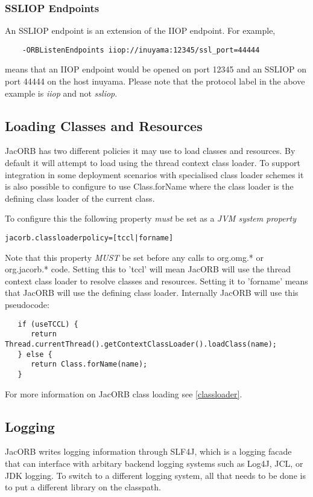 \subsubsection{SSLIOP Endpoints}
An SSLIOP endpoint is an extension of the IIOP endpoint. For example,
\begin{verbatim}
    -ORBListenEndpoints iiop://inuyama:12345/ssl_port=44444
\end{verbatim}
means that an IIOP endpoint would be opened on port 12345 and an SSLIOP on
port 44444 on the host inuyama.  Please note that the protocol label in the
above example is \emph{iiop} and not \emph{ssliop}.

\subsection{Loading Classes and Resources}
\label{tccl}
JacORB has two different policies it may use to load classes and resources. By default it will attempt to load
using the thread context class loader. To support integration in some deployment scenarios with specialised class
loader schemes it is also possible to configure to use Class.forName where the class loader is the defining class
loader of the current class.

To configure this the following property \emph{must} be set as a \emph{JVM system property}
\begin{verbatim}
jacorb.classloaderpolicy=[tccl|forname]
\end{verbatim}
Note that this property \emph{MUST} be set before any calls to org.omg.* or org.jacorb.* code. Setting this
to 'tccl' will mean JacORB will use the thread context class loader to resolve classes and resources. Setting it to
'forname' means that JacORB will use the defining class loader. Internally JacORB will use this pseudocode:

\begin{verbatim}
   if (useTCCL) {
      return Thread.currentThread().getContextClassLoader().loadClass(name);
   } else {
      return Class.forName(name);
   }
\end{verbatim}

For more information on JacORB class loading see \ref{classloader}.

\subsection{Logging}

JacORB writes logging information through SLF4J, which is a logging
facade that can interface with arbitary backend logging systems such
as Log4J, JCL, or JDK logging.  To switch to a different logging
system, all that needs to be done is to put a different library on the
classpath.


